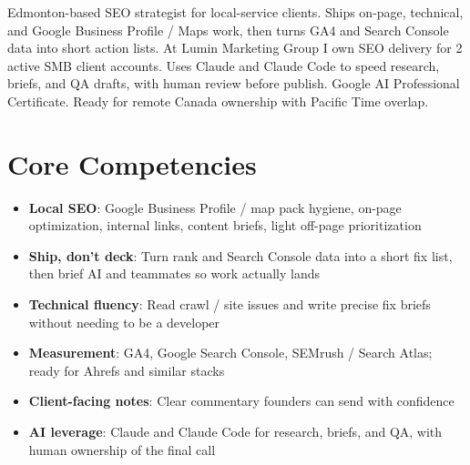 \documentclass[11pt,a4paper,sans]{moderncv}
\begin{document}
\makecvtitle

\vspace{6pt}
\small{Edmonton-based SEO strategist for local-service clients. Ships on-page, technical, and Google Business Profile / Maps work, then turns GA4 and Search Console data into short action lists. At Lumin Marketing Group I own SEO delivery for 2 active SMB client accounts. Uses Claude and Claude Code to speed research, briefs, and QA drafts, with human review before publish. Google AI Professional Certificate. Ready for remote Canada ownership with Pacific Time overlap.}

\section{Core Competencies}
\vspace{1pt}
\begin{itemize}
\item \textbf{Local SEO}: Google Business Profile / map pack hygiene, on-page optimization, internal links, content briefs, light off-page prioritization
\item \textbf{Ship, don't deck}: Turn rank and Search Console data into a short fix list, then brief AI and teammates so work actually lands
\item \textbf{Technical fluency}: Read crawl / site issues and write precise fix briefs without needing to be a developer
\item \textbf{Measurement}: GA4, Google Search Console, SEMrush / Search Atlas; ready for Ahrefs and similar stacks
\item \textbf{Client-facing notes}: Clear commentary founders can send with confidence
\item \textbf{AI leverage}: Claude and Claude Code for research, briefs, and QA, with human ownership of the final call
\end{itemize}
\end{document}
